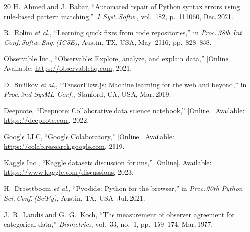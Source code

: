 \documentclass[conference]{IEEEtran}
\begin{document}
\begin{thebibliography}{20}
H.~Ahmed and J.~Babar,
``Automated repair of Python syntax errors using rule-based
pattern matching,''
\textit{J.\,Syst.\,Softw.}, vol.~182, p.~111060, Dec.\,2021.

R.~Rolim \textit{et al.},
``Learning quick fixes from code repositories,''
in \textit{Proc.\,38th Int.\,Conf.\,Softw.\,Eng.\,(ICSE)},
Austin, TX, USA, May~2016, pp.~828--838.

Observable Inc.,
``Observable: Explore, analyze, and explain data,''
[Online]. Available: \url{https://observablehq.com}, 2021.

D.~Smilkov \textit{et al.},
``TensorFlow.js: Machine learning for the web and beyond,''
in \textit{Proc.\,2nd SysML Conf.},
Stanford, CA, USA, Mar.\,2019.

Deepnote,
``Deepnote: Collaborative data science notebook,''
[Online]. Available: \url{https://deepnote.com}, 2022.

Google LLC, ``Google Colaboratory,''
[Online]. Available: \url{https://colab.research.google.com}, 2019.

Kaggle Inc., ``Kaggle datasets discussion forums,''
[Online]. Available: \url{https://www.kaggle.com/discussions}, 2023.

H.~Droettboom \textit{et al.},
``Pyodide: Python for the browser,''
in \textit{Proc.\,20th Python Sci.\,Conf.\,(SciPy)},
Austin, TX, USA, Jul.\,2021.

J.~R.~Landis and G.~G.~Koch,
``The measurement of observer agreement for categorical data,''
\textit{Biometrics}, vol.~33, no.~1, pp.~159--174, Mar.\,1977.

\end{thebibliography}
\end{document}
